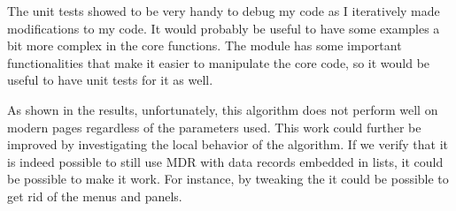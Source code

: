 \documentclass[10pt]{article}
\begin{document}
The unit tests showed to be very handy to debug my code as I iteratively made modifications to my code. It would probably be useful to have some examples a bit more complex in the core functions. The module  has some important functionalities that make it easier to manipulate the core code, so it would be useful to have unit tests for it as well.

As shown in the results, unfortunately, this algorithm does not perform well on modern pages regardless of the parameters used. This work could further be improved by investigating the local behavior of the algorithm. If we verify that it is indeed possible to still use MDR with data records embedded in lists, it could be possible to make it work. For instance, by tweaking the  it could be possible to get rid of the menus and panels.


\newpage
 
\end{document}
